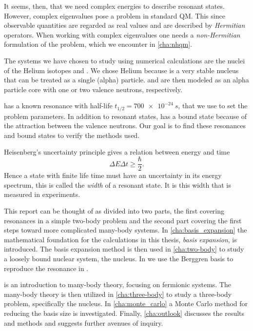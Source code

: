 \documentclass[../main/report.tex]{subfiles}
\begin{document}
It seems, then, that we need complex energies to describe resonant 
states. However, complex eigenvalues pose a problem in standard QM. 
This since observable quantities are regarded as real values 
and are described by \emph{Hermitian} operators. When working with 
complex eigenvalues one needs a \emph{non-Hermitian} formulation of 
the problem, which we encounter in \cref{cha:nhqm}.

The systems we have chosen to study using numerical calculations
are the nuclei of the  Helium isotopes  and . We chose Helium  
because  is a very stable nucleus that can be treated 
as a single (alpha) particle.  and  are then modeled
as an alpha particle core with one or two valence neutrons, 
respectively. 

 has a known resonance with half-life $t_{1/2} = \SI{700e-24}{s}$,
that we use to set the problem parameters.  In addition to resonant states,  has a bound state because of the attraction between the valence neutrons. Our goal is to find these resonances and bound states to verify the methods used.

 Heisenberg's uncertainty principle gives a relation between energy and time
 \begin{equation}
	 \Delta E \Delta t \ge \frac{\hbar}{2}.
 \end{equation}
 Hence a state with finite life time must have an uncertainty in its energy spectrum, this is called the \emph{width} of a resonant state. It is this width that is measured in experiments.

This report can be thought of as divided into two parts, the first covering resonances in a simple two-body problem and the second part covering the first steps toward more complicated many-body systems. 
In \cref{cha:basis_expansion} the mathematical foundation for the calculations in this thesis, \emph{basis expansion}, is introduced.
The basis expansion method is then used in \cref{cha:two-body} to study a loosely bound nuclear system, the  nucleus.
In  we use the Berggren basis to reproduce the resonance in .

 is an introduction to many-body theory, focusing on fermionic systems. 
The many-body theory is then utilized in \cref{cha:three-body} 
to study a three-body problem, specifically the  nucleus.  
In \cref{cha:monte_carlo} a Monte Carlo method for reducing the basis size is investigated. 
Finally, \cref{cha:outlook} discusses the results and methods and suggests further avenues of inquiry.
\end{document}
